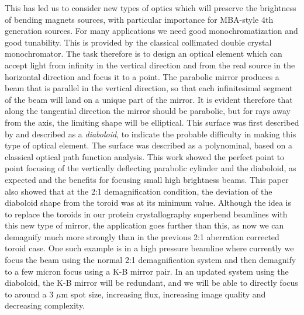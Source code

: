 \documentclass{iucr}              %
\begin{document}
This has led us to consider new types of optics which will preserve the brightness of bending magnets sources, with particular importance for MBA-style 4th generation sources.   
For many applications we need good monochromatization and good tunability.  This is provided by the classical collimated double crystal monochromator.  The task therefore is to design an optical element which can accept light from infinity in the vertical direction and from the real source in the horizontal direction and focus it to a point.  The parabolic mirror produces a beam that is parallel in the vertical direction, so that each infinitesimal segment of the beam will land on a unique part of the mirror.  It is evident therefore that along the tangential direction the mirror should be parabolic, but for rays away from the axis, the limiting shape will be elliptical. 
This surface was first described by \cite{McKinneySPIE2009} and described as a {\it diaboloid}, to indicate the probable difficulty in making this type of optical element.  The surface was described as a polynominal, based on a classical optical path function analysis.  This work showed the perfect point to point focusing of the vertically deflecting parabolic cylinder and the diaboloid, as expected and the benefits for focusing small high brightness beams.  This paper also showed that at the 2:1 demagnification condition, the deviation of the diaboloid shape from the toroid was at its minimum value. Although the idea is to replace the toroids in our protein crystallography superbend beamlines with this new type of mirror, the application goes further than this, as now we can demagnify much more strongly than in the previous 2:1 aberration corrected toroid case.  One such example is in a high pressure beamline where currently we focus the beam using the normal 2:1 demagnification system and then demagnify to a few micron focus using a K-B mirror pair.  In an updated system using the diaboloid, the K-B mirror will be redundant, and we will be able to directly focus to around a 3 $\mu$m spot size, increasing flux, increasing image quality and decreasing complexity.
\end{document}
